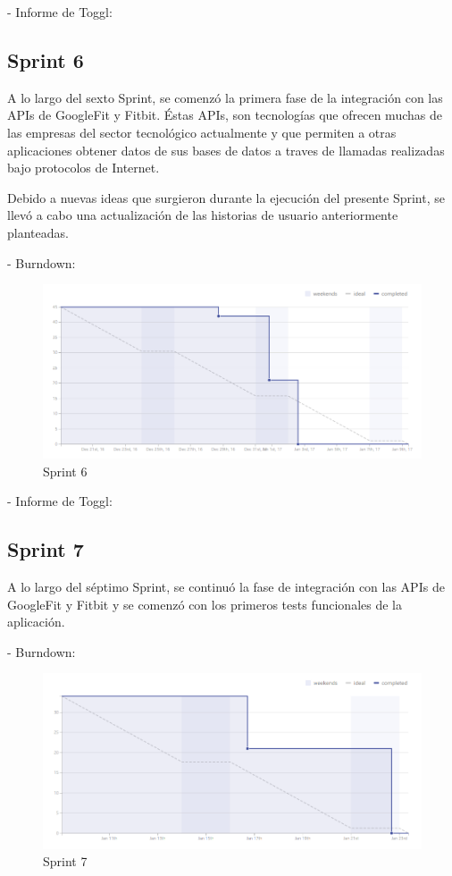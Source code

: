 \documentclass[11pt,openany]{book}
\begin{document}
- Informe de Toggl:



\subsection{Sprint 6}

A lo largo del sexto Sprint, se comenzó la primera fase de la integración con las APIs de GoogleFit y Fitbit. Éstas APIs, son tecnologías que ofrecen muchas de las empresas del sector tecnológico actualmente y que permiten a otras aplicaciones obtener datos de sus bases de datos a traves de llamadas realizadas bajo protocolos de Internet. 

Debido a nuevas ideas que surgieron durante la ejecución del presente Sprint, se llevó a cabo una actualización de las historias de usuario anteriormente planteadas.

- Burndown:

\begin{figure}[H]
\centering
\includegraphics[totalheight=7cm]{burndowns/Sprint6.png}
\caption{Sprint 6}
\end{figure}

- Informe de Toggl:



\subsection{Sprint 7}

A lo largo del séptimo Sprint, se continuó la fase de integración con las APIs de GoogleFit y Fitbit y se comenzó con los primeros tests funcionales de la aplicación.

- Burndown:

\begin{figure}[H]
\centering
\includegraphics[totalheight=7cm]{burndowns/Sprint7.png}
\caption{Sprint 7}
\end{figure}
\end{document}
